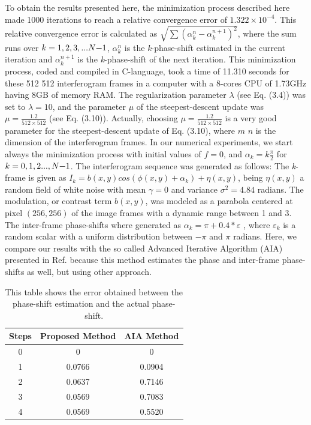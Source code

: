 To obtain the results presented here, the minimization process described
here made 1000 iterations to reach a relative convergence error of
$1.322\times10^{-4}$. This relative convergence error is calculated
as $\sqrt{\sum(\alpha_{k}^{n}-\alpha_{k}^{n+1})^{2}}$, where the
sum runs over $k=1,2,3,...N\text{\textminus}1$, $\alpha_{k}^{n}$
is the \emph{k}-phase-shift estimated in the current iteration and
$\alpha_{k}^{n+1}$ is the \emph{k}-phase-shift of the next iteration.
This minimization process, coded and compiled in C-language, took
a time of 11.310 seconds for these 512 \texttimes{} 512 interferogram
frames in a computer with a 8-cores CPU of 1.73GHz having 8GB of memory
RAM. The regularization parameter $\lambda$ (see Eq. (3.4)) was set
to $\lambda=10$, and the parameter $\mu$ of the steepest-descent
update was $\mu=\frac{1.2}{512\times512}$ (see Eq. (3.10)). Actually, choosing
$\mu=\frac{1.2}{512\times512}$ is a very good parameter for the steepest-descent
update of Eq. (3.10), where $m$ \texttimes{} $n$ is the dimension
of the interferogram frames. In our numerical experiments, we start
always the minimization process with initial values of $f=0$, and
$\alpha_{k}=k\frac{\pi}{2}$ for $k=0,1,2...,N\text{\textminus}1$.
The interferogram sequence was generated as follows: The \emph{k}-frame
is given as $I_{k}=b(x,y)cos(\phi(x,y)+\alpha_{k})+\eta(x,y)$, being
$\eta(x,y)$ a random field of white noise with mean $\gamma=0$ and
variance $\sigma^{2}=4.84$ radians. The modulation, or contrast term
$b(x,y)$, was modeled as a parabola centered at pixel $(256,256)$
of the image frames with a dynamic range between 1 and 3. The inter-frame
phase-shifts where generated as $\alpha_{k}=\pi+0.4*\varepsilon$
, where $\varepsilon_{k}$ is a random scalar with a uniform distribution
between $-\pi$ and $\pi$ radians. Here, we compare our results with
the so called Advanced Iterative Algorithm (AIA) presented in Ref.
\cite{Wang:04} because this method estimates the phase and inter-frame
phase-shifts as well, but using other approach.
\begin{table}
\begin{centering}
\begin{tabular}{|c|c|c|}
\hline 
Steps & Proposed Method & AIA Method\tabularnewline
\hline 
\hline 
0 & 0 & 0\tabularnewline
\hline 
1 & 0.0766 & 0.0904\tabularnewline
\hline 
2 & 0.0637 & 0.7146\tabularnewline
\hline 
3 & 0.0569 & 0.7083\tabularnewline
\hline 
4 & 0.0569 & 0.5520\tabularnewline
\hline 
\end{tabular}
\par\end{centering}

\caption{This table shows the error obtained between the phase-shift estimation
and the actual phase-shift.}
\end{table}
